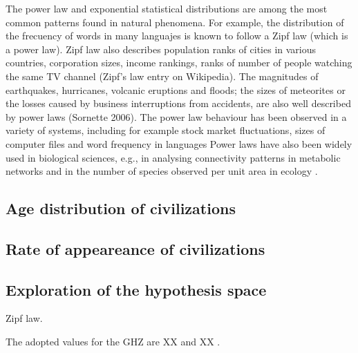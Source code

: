 \documentclass[crop]{CSLB}%
\begin{document}
The power law and exponential statistical distributions are among the
most common patterns found in natural phenomena.
%
For example, the distribution of the frecuency of words in many
languajes is known to follow a Zipf law (which is a power law).
%
Zipf law also describes population ranks of cities in various
countries, corporation sizes, income rankings, ranks of number of
people watching the same TV channel (Zipf's law entry on Wikipedia).
%
The magnitudes of earthquakes, hurricanes, volcanic eruptions and
floods; the sizes of meteorites or the losses caused by business
interruptions from accidents, are also well described by power laws
(Sornette 2006).
%
The power law behaviour has been observed in a variety of systems,
including for example stock market fluctuations, sizes of computer
files and word frequency in languages \citep{mitzenmacher_brief_2004,
Newman_power_2005, simkin_theory_2006}
%
Power laws have also been widely used in biological sciences, e.g., in
analysing connectivity patterns in metabolic networks
\citep{jeong_large_2000} and in the number of species observed per
unit area in ecology \citep{garcia_origin_2006, frank_common_2009}.



              

\subsection{Age distribution of civilizations}




\subsection{Rate of appeareance of civilizations}



                      

\subsection{Exploration of the hypothesis space}


Zipf law.

The adopted values for the GHZ are XX and XX \citep{Lineweaver2004}.

        
\end{document}
